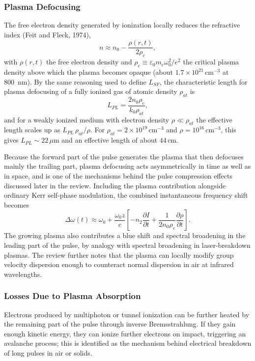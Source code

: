 \documentclass[11pt,a4paper]{article}
\begin{document}
\subsubsection{Plasma Defocusing}
The free electron density generated by ionization locally reduces the refractive index (Feit and Fleck, 1974),
\begin{equation}
n \approx n_0 - \frac{\rho(r,t)}{2\rho_c},
\end{equation}
with $\rho(r,t)$ the free electron density and $\rho_c\equiv \varepsilon_0m_e\omega_0^2/e^2$ the critical plasma density above which the plasma becomes opaque (about $1.7\times10^{21}\,\text{cm}^{-3}$ at 800~nm). By the same reasoning used to define $L_{SF}$, the characteristic length for plasma defocusing of a fully ionized gas of atomic density $\rho_{at}$ is
\begin{equation}
L_{PL} = \frac{2n_0\rho_c}{k_0\rho_{at}},
\end{equation}
and for a weakly ionized medium with electron density $\rho\ll\rho_{at}$ the effective length scales up as $L_{PL}\,\rho_{at}/\rho$. For $\rho_{at}=2\times10^{19}\,\text{cm}^{-3}$ and $\rho=10^{16}\,\text{cm}^{-3}$, this gives $L_{PL}\sim22\,\mu\text{m}$ and an effective length of about $44\,\text{cm}$.

Because the forward part of the pulse generates the plasma that then defocuses mainly the trailing part, plasma defocusing acts asymmetrically in time as well as in space, and is one of the mechanisms behind the pulse compression effects discussed later in the review. Including the plasma contribution alongside ordinary Kerr self-phase modulation, the combined instantaneous frequency shift becomes
\begin{equation}
\Delta\omega(t) \approx \omega_0 + \frac{\omega_0 z}{c}\left[-n_2\frac{\partial I}{\partial t} + \frac{1}{2n_0\rho_c}\frac{\partial\rho}{\partial t}\right].
\end{equation}
The growing plasma also contributes a blue shift and spectral broadening in the leading part of the pulse, by analogy with spectral broadening in laser-breakdown plasmas. The review further notes that the plasma can locally modify group velocity dispersion enough to counteract normal dispersion in air at infrared wavelengths.

\subsubsection{Losses Due to Plasma Absorption}
Electrons produced by multiphoton or tunnel ionization can be further heated by the remaining part of the pulse through inverse Bremsstrahlung. If they gain enough kinetic energy, they can ionize further electrons on impact, triggering an avalanche process; this is identified as the mechanism behind electrical breakdown of long pulses in air or solids.
\end{document}
